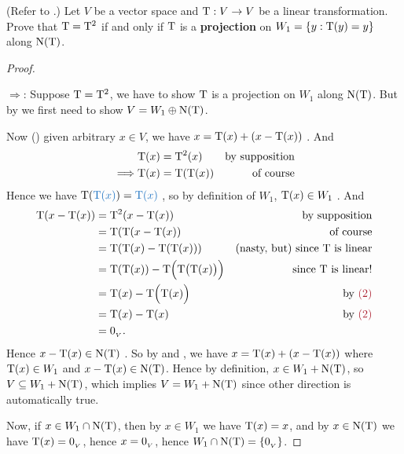 \begin{exercise} \label{exercise 2.3.17}
(Refer to .)
Let \(V\) be a vector space and \(\mathrm{T} : V \to V\) be a linear transformation.
Prove that \(\mathrm{T} = \mathrm{T}^2\) if and only if \(\mathrm{T}\) is a \textbf{projection} on \(W_1 = \{ y : \mathrm{T}(y) = y \}\)
along \(\mathrm{N(T)}\).
\end{exercise}

\begin{proof} \ 

\(\Longrightarrow\): Suppose \(\mathrm{T} = \mathrm{T}^2\), we have to show \(\mathrm{T}\) is a projection on \(W_1\) along \(\mathrm{N(T)}\).
But by  we first need to show \(V = W_1 \oplus \mathrm{N(T)}\).

Now () given arbitrary \(x \in V\), we have \(x = \mathrm{T}(x) + (x - \mathrm{T}(x))\) .
And
\begin{align*}
             & \mathrm{T}(x) = \mathrm{T}^2(x) & \text{by supposition} \\
    \implies & \mathrm{T}(x) = \mathrm{T}(\mathrm{T}(x)) & \text{of course}
\end{align*}
Hence we have \(\T(\BLUE{\T(x)}) = \BLUE{\T(x)}\) , so by definition of \(W_1\), \(\mathrm{T}(x) \in W_1\) .
And
\begin{align*}
        \T(x - \T(x)) & = \T^2(x - \T(x)) & \text{by supposition} \\
                      & = \T(\T(x - \T(x)) & \text{of course} \\
                      & = \T(\T(x) - \T(\T(x))) & \text{(nasty, but) since \(\T\) is linear} \\
                      & = \T(\T(x)) - \T\Big( \T \big( \T(x) \big) \Big) & \text{since \(\T\) is linear!} \\
                      & = \T(x) - \T\Big( \T(x) \Big) & \text{by \MAROON{(2)}} \\
                      & = \T(x) - \T(x) & \text{by \MAROON{(2)}} \\
                      & = \OV.
\end{align*}
Hence \(x - \mathrm{T}(x) \in \mathrm{N(T)}\) .
So by  and , we have \(x = \mathrm{T}(x) + (x - \mathrm{T}(x))\) where \(\mathrm{T}(x) \in W_1\) and \(x - \mathrm{T}(x) \in \mathrm{N(T)}\).
Hence by definition, \(x \in W_1 + \mathrm{N(T)}\), so \(V \subseteq W_1 + \mathrm{N(T)}\), which implies \(V = W_1 + \mathrm{N(T)}\) since other direction is automatically true.

Now, if \(x \in W_1 \cap \mathrm{N(T)}\), then by \(x \in W_1\) we have \(\mathrm{T}(x) = x\),
and by \(x \in \mathrm{N(T)}\) we have \(\mathrm{T}(x) = 0_{_V}\), hence \(x = 0_{_V}\), hence \(W_1 \cap \mathrm{N(T)} = \{ 0_{_V} \}\).


\end{proof}
